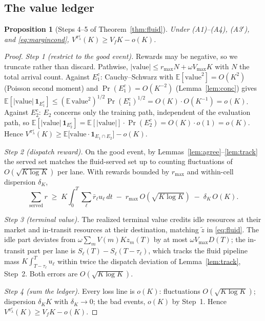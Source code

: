 \documentclass[11pt]{article}
\newtheorem{proposition}{Proposition}
\newcommand{\pol}{\pi_{\lambda}}
\begin{document}
\subsection{The value ledger}

\begin{proposition}[Steps 4--5 of Theorem~\ref{thm:fluid}]
\label{prop:ledger}
Under (A1)--(A4), (A3$'$), and \eqref{eq:margincond},
$V^{\pol^{\varepsilon}}(K) \geq V_f K - o(K)$.
\end{proposition}

\begin{proof}
\emph{Step 1 (restrict to the good event).} Rewards may be negative,
so we truncate rather than discard. Pathwise,
$|\text{value}| \leq r_{\max} N + \omega V_{\max} K$ with $N$ the
total arrival count. Against $E_1^c$: Cauchy--Schwarz with
$\mathbb{E}[\text{value}^2] = O(K^2)$ (Poisson second moment) and
$\Pr(E_1^c) = O(K^{-2})$ (Lemma~\ref{lem:conc}) gives
$\mathbb{E}[|\text{value}|\,\mathbf{1}_{E_1^c}]
\leq (\mathbb{E}\,\text{value}^2)^{1/2} \Pr(E_1^c)^{1/2}
= O(K) \cdot O(K^{-1}) = o(K)$. Against $E_2^c$: $E_2$ concerns only
the training path, independent of the evaluation path, so
$\mathbb{E}[|\text{value}|\,\mathbf{1}_{E_2^c}]
= \mathbb{E}[|\text{value}|] \cdot \Pr(E_2^c) = O(K) \cdot o(1)
= o(K)$. Hence
$V^{\pol^{\varepsilon}}(K) \geq
\mathbb{E}\bigl[ \text{value} \cdot \mathbf{1}_{E_1 \cap E_2} \bigr]
- o(K)$.

\emph{Step 2 (dispatch reward).} On the good event, by
Lemmas~\ref{lem:agree}--\ref{lem:track} the served set matches the
fluid-served set up to counting fluctuations of
$O(\sqrt{K \log K})$ per lane. With rewards bounded by $r_{\max}$ and
within-cell dispersion $\delta_K$,
\begin{equation}
  \sum_{\text{served}} r
  \;\geq\; K \int_0^T \sum_{\ell} \bar{r}_{\ell} u_{\ell}\, dt
  \;-\; r_{\max}\, O(\sqrt{K \log K})
  \;-\; \delta_K\, O(K).
\end{equation}

\emph{Step 3 (terminal value).} The realized terminal value credits
idle resources at their market and in-transit resources at their
destination, matching $\tilde{z}$ in \eqref{eq:fluid}. The idle part
deviates from $\omega \sum_m V(m) K z_m(T)$ by at most
$\omega V_{\max} D(T)$; the in-transit part per lane is
$S_{\ell}(T) - S_{\ell}(T - \tau_{\ell})$, which tracks the fluid
pipeline mass $K \int_{T - \tau_{\ell}}^{T} u_{\ell}$ within twice the
dispatch deviation of Lemma~\ref{lem:track}, Step~2. Both errors are
$O(\sqrt{K \log K})$.

\emph{Step 4 (sum the ledger).} Every loss line is $o(K)$:
fluctuations $O(\sqrt{K \log K})$; dispersion $\delta_K K$ with
$\delta_K \to 0$; the bad events, $o(K)$ by Step~1.
Hence $V^{\pol^{\varepsilon}}(K) \geq V_f K - o(K)$.
\end{proof}
\end{document}

